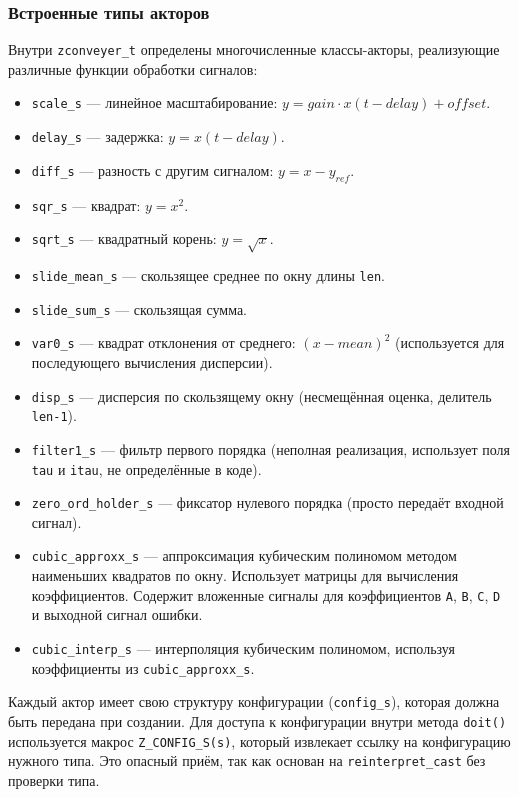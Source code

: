 \documentclass[a4paper,12pt]{article}
\begin{document}
\subsubsection{Встроенные типы акторов}

Внутри \texttt{zconveyer\_t} определены многочисленные классы-акторы, реализующие различные функции обработки сигналов:

\begin{itemize}
    \item \texttt{scale\_s} — линейное масштабирование: $y = gain \cdot x(t - delay) + offset$.
    \item \texttt{delay\_s} — задержка: $y = x(t - delay)$.
    \item \texttt{diff\_s} — разность с другим сигналом: $y = x - y_{ref}$.
    \item \texttt{sqr\_s} — квадрат: $y = x^2$.
    \item \texttt{sqrt\_s} — квадратный корень: $y = \sqrt{x}$.
    \item \texttt{slide\_mean\_s} — скользящее среднее по окну длины \texttt{len}.
    \item \texttt{slide\_sum\_s} — скользящая сумма.
    \item \texttt{var0\_s} — квадрат отклонения от среднего: $(x - mean)^2$ (используется для последующего вычисления дисперсии).
    \item \texttt{disp\_s} — дисперсия по скользящему окну (несмещённая оценка, делитель \texttt{len-1}).
    \item \texttt{filter1\_s} — фильтр первого порядка (неполная реализация, использует поля \texttt{tau} и \texttt{itau}, не определённые в коде).
    \item \texttt{zero\_ord\_holder\_s} — фиксатор нулевого порядка (просто передаёт входной сигнал).
    \item \texttt{cubic\_approxx\_s} — аппроксимация кубическим полиномом методом наименьших квадратов по окну. Использует матрицы для вычисления коэффициентов. Содержит вложенные сигналы для коэффициентов \texttt{A}, \texttt{B}, \texttt{C}, \texttt{D} и выходной сигнал ошибки.
    \item \texttt{cubic\_interp\_s} — интерполяция кубическим полиномом, используя коэффициенты из \texttt{cubic\_approxx\_s}.
\end{itemize}

Каждый актор имеет свою структуру конфигурации (\texttt{config\_s}), которая должна быть передана при создании. Для доступа к конфигурации внутри метода \texttt{doit()} используется макрос \texttt{Z\_CONFIG\_S(s)}, который извлекает ссылку на конфигурацию нужного типа. Это опасный приём, так как основан на \texttt{reinterpret\_cast} без проверки типа.
\end{document}
